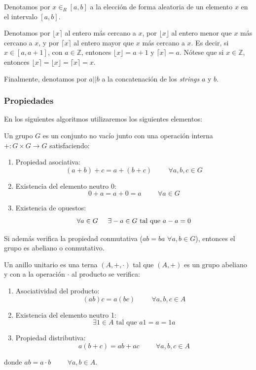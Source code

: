 Denotamos por $x \in_{R} [a, b]$ a la elección de forma aleatoria de un elemento $x$ en el intervalo $[a, b]$.

Denotamos por $\lfloor x \rceil$ al entero más cercano a $x$, por $\lfloor x \rfloor$ al entero menor que $x$ más cercano a $x$, y por $\lceil x \rceil$ al entero mayor que $x$ más cercano a $x$. Es decir, si $x \in [a, a+1]$, con $a \in \mathbb{Z}$, entonces $\lfloor x \rfloor = a+1$ y $\lceil x \rceil = a$. Nótese que si $x \in \mathbb{Z}$, entonces $\lfloor x \rceil = \lfloor x \rfloor = \lceil x \rceil = x$.

Finalmente, denotamos por $a||b$ a la concatenación de los \emph{strings} $a$ y $b$.

\subsubsection{Propiedades}

En los siguientes algoritmos utilizaremos los siguientes elementos:

\begin{definition}[Grupo]
Un grupo $G$ es un conjunto no vacío junto con una operación interna $+: G \times G \to G$ satisfaciendo:
\begin{enumerate}
    \item Propiedad asociativa:
    $$(a + b) + c = a + (b + c) \hspace{1cm} \forall a, b, c \in G$$
    \item Existencia del elemento neutro 0:
    $$0 + a = a + 0 = a \hspace{1cm} \forall a \in G$$
    \item Existencia de opuestos:
    $$\forall a \in G \hspace{0.5cm} \exists -a \in G \text{ tal que } a - a = 0$$
\end{enumerate}

Si además verifica la propiedad conmutativa ($ab = ba$ $\forall a, b \in G$), entonces el grupo es abeliano o conmutativo.
\end{definition}

\begin{definition}[Anillo]
    Un anillo unitario es una terna $(A, +, \cdot)$ tal que $(A, +)$ es un grupo abeliano y con a la operación $\cdot$ al producto se verifica:
    \begin{enumerate}
        \item Asociatividad del producto:
        $$(ab)c = a(bc) \hspace{1cm} \forall a, b, c \in A$$
        
        \item Existencia del elemento neutro 1:
        $$\exists 1 \in A \text{ tal que } a1 = a = 1a$$
        
        \item Propiedad distributiva:
        $$a (b + c) = ab + ac \hspace{1cm} \forall a, b, c \in A$$
    \end{enumerate}
donde $ab = a \cdot b \hspace{1cm} \forall a, b \in A$.
\end{definition}

